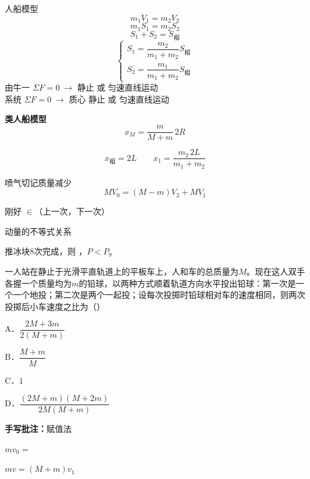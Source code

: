 \noindent 人船模型
\[ m_1V_1=m_2V_2 \]
\[ m_1S_1=m_2S_2 \]
\[ S_1+S_2=S_{\text{相}} \]
\[ \begin{cases} S_1=\dfrac{m_2}{m_1+m_2}S_{\text{相}}\\[6pt] S_2=\dfrac{m_1}{m_1+m_2}S_{\text{相}}\end{cases} \]
\noindent 由牛一 $\Sigma F=0\ \longrightarrow$ 静止 或 匀速直线运动 \\
系统 $\Sigma F=0\ \longrightarrow$ 质心 静止 或 匀速直线运动

\textbf{类人船模型}
\[
x_M=\frac{m}{M+m}\,2R
\]

\[
x_{\text{相}}=2L\qquad x_1=\frac{m_2\,2L}{m_1+m_2}
\]

喷气切记质量减少
\[
MV_0=(M-m)V_2+MV_1
\]

刚好 $\in$（上一次，下一次）

动量的不等式关系

推冰块8次完成，则 ，$P<P_9$ %

\begin{problem}[5]
一人站在静止于光滑平直轨道上的平板车上，人和车的总质量为$M$。现在这人双手各握一个质量均为$m$的铅球，以两种方式顺着轨道方向水平投出铅球：第一次是一个一个地投；第二次是两个一起投；设每次投掷时铅球相对车的速度相同，则两次投掷后小车速度之比为（）

A．$\dfrac{2M+3m}{2(M+m)}$

B．$\dfrac{M+m}{M}$

C．$1$%

D．$\dfrac{(2M+m)(M+2m)}{2M(M+m)}$
\end{problem}

\textbf{手写批注：}赋值法

$mv_0=$%

$mv=(M+m)v_1$

